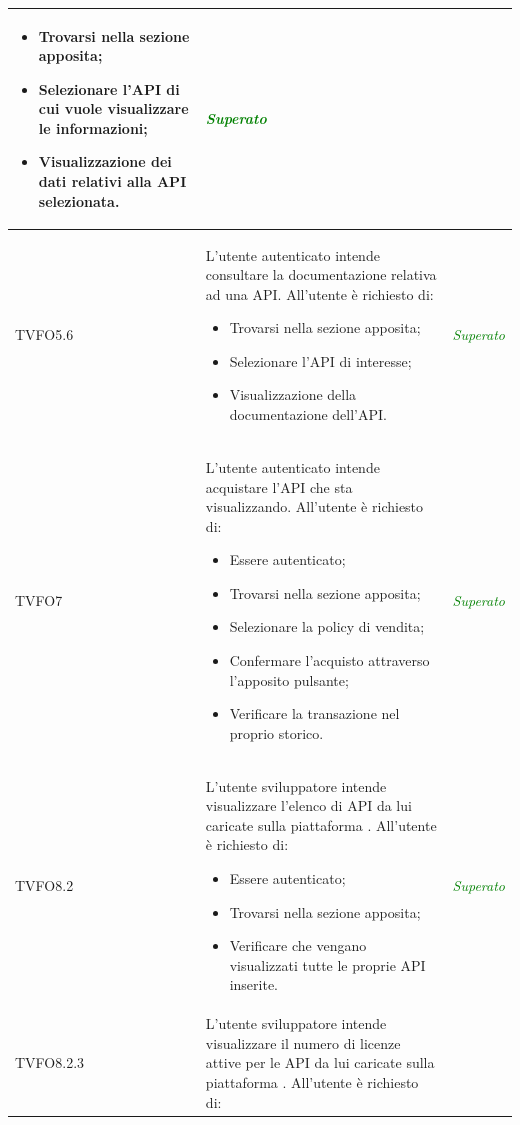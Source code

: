 \begin{longtable}{|>{\centering\arraybackslash}p{2.3cm}|>{\centering\arraybackslash}p{7.5cm} | >{\centering\arraybackslash}p{4cm}|}
		\begin{itemize}
			\item Trovarsi nella sezione apposita;
			\item Selezionare l'API di cui vuole visualizzare le informazioni;
			\item Visualizzazione dei dati relativi alla API selezionata.
		\end{itemize} & \textcolor{Green}{\textit{Superato}}\\ \hline
		\hypertarget{TVFO5.6}{TVFO5.6} & L’utente autenticato  intende consultare la documentazione relativa ad una API. All’utente è richiesto di:
		\begin{itemize}
			\item Trovarsi nella sezione apposita;
			\item Selezionare l'API di interesse;
			\item Visualizzazione della documentazione dell'API.
		\end{itemize} & \textcolor{Green}{\textit{Superato}}\\ \hline
		\hypertarget{TVFO7}{TVFO7} & L’utente autenticato intende acquistare l'API che sta visualizzando. All’utente è richiesto di:
		\begin{itemize}
			\item Essere autenticato;
			\item Trovarsi nella sezione apposita;
			\item Selezionare la policy di vendita;
			\item Confermare l'acquisto attraverso l'apposito pulsante;
			\item Verificare la transazione nel proprio storico.
		\end{itemize} & \textcolor{Green}{\textit{Superato}}\\ \hline
		\hypertarget{TVFO8.2}{TVFO8.2} & L’utente sviluppatore intende visualizzare l'elenco di API da lui caricate sulla piattaforma \progetto. All’utente è richiesto di:
		\begin{itemize}
			\item Essere autenticato;
			\item Trovarsi nella sezione apposita;
			\item Verificare che vengano visualizzati tutte le proprie API inserite.
		\end{itemize} & \textcolor{Green}{\textit{Superato}}\\ \hline
		\hypertarget{TVFO8.2.3}{TVFO8.2.3} & L’utente sviluppatore intende visualizzare il numero di licenze attive per le API da lui caricate sulla piattaforma \progetto. All’utente è richiesto di:

\end{longtable}
